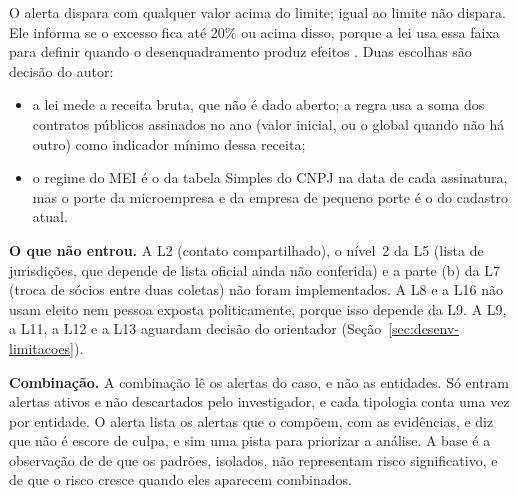O alerta dispara com qualquer valor acima do limite; igual ao limite não
dispara. Ele informa se o excesso fica até 20\% ou acima disso, porque a lei
usa essa faixa para definir quando o desenquadramento produz efeitos
\cite[art.~3º, §§ 9º-A e 12; art.~18-A, § 7º, III e IV]{brasil2006lcp123}.
Duas escolhas são decisão do autor:
\begin{itemize}
	\item a lei mede a receita bruta, que não é dado aberto; a regra usa a
	soma dos contratos públicos assinados no ano (valor inicial, ou o global
	quando não há outro) como indicador mínimo dessa receita;
	\item o regime do MEI é o da tabela Simples do CNPJ na data de cada
	assinatura, mas o porte da microempresa e da empresa de pequeno porte é
	o do cadastro atual.
\end{itemize}

\textbf{O que não entrou.} A L2 (contato compartilhado), o nível~2 da L5
(lista de jurisdições, que depende de lista oficial ainda não conferida) e
a parte (b) da L7 (troca de sócios entre duas coletas) não foram
implementados. A L8 e a L16 não usam eleito nem pessoa exposta
politicamente, porque isso depende da L9. A L9, a L11, a L12 e a L13
aguardam decisão do orientador (Seção~\ref{sec:desenv-limitacoes}).

\textbf{Combinação.} A combinação lê os alertas do caso, e não as
entidades. Só entram alertas ativos e não descartados pelo investigador, e
cada tipologia conta uma vez por entidade. O alerta lista os alertas que o
compõem, com as evidências, e diz que não é escore de culpa, e sim uma pista
para priorizar a análise. A base é a observação de
 de que os padrões, isolados, não
representam risco significativo, e de que o risco cresce quando eles
aparecem combinados.

